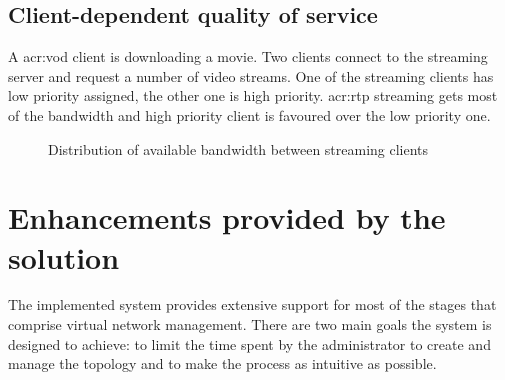 \documentclass[11pt]{book}
\begin{document}
      \subsection{Client-dependent quality of service}
      \label{sub:uc:client}

        A \gls{acr:vod} client is downloading a movie. Two clients connect to the streaming server and request a number
        of video streams. One of the streaming clients has low priority assigned, the other one is high priority.
        \gls{acr:rtp} streaming gets most of the bandwidth and high priority client is favoured over the low priority
        one.

        \begin{figure}[H]
          \centering


          \caption{Distribution of available bandwidth between streaming clients}
        \end{figure}


    \section{Enhancements provided by the solution}
    \label{sec:uc:enhance}

      The implemented system provides extensive support for most of the stages that comprise virtual network management.
      There are two main goals the system is designed to achieve: to limit the time spent by the administrator to create
      and manage the topology and to make the process as intuitive as possible.
\end{document}
